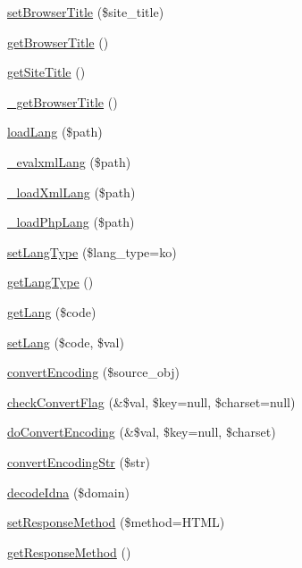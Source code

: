 \begin{DoxyCompactItemize}
\hyperlink{classContext_aab07bc95a7a855c4d9608b4ed615807f}{set\+Browser\+Title} (\$site\+\_\+title)
\item 
\hyperlink{classContext_a19f432349a41af2ed36b2cd5e6ba96a5}{get\+Browser\+Title} ()
\item 
\hyperlink{classContext_a0ee79330d3ee12c811cd784e24a7b017}{get\+Site\+Title} ()
\item 
\hyperlink{classContext_ab8f518a596abcbbd70b20dd46442ae0a}{\+\_\+get\+Browser\+Title} ()
\item 
\hyperlink{classContext_a7b22a741ff804e5cdaafd952273bd70c}{load\+Lang} (\$path)
\item 
\hyperlink{classContext_a45bd19b6edf9e66582842a3f6e50fa4b}{\+\_\+evalxml\+Lang} (\$path)
\item 
\hyperlink{classContext_af3ba6aaa8fa5f6c758b7716ec7135ab3}{\+\_\+load\+Xml\+Lang} (\$path)
\item 
\hyperlink{classContext_a3ad6fc7782e7234fe77357da28218310}{\+\_\+load\+Php\+Lang} (\$path)
\item 
\hyperlink{classContext_a234d434bfe795cbc1872ac4088b4070a}{set\+Lang\+Type} (\$lang\+\_\+type=\textquotesingle{}ko\textquotesingle{})
\item 
\hyperlink{classContext_ae75d6f4064d09e48d0d76614b6997e29}{get\+Lang\+Type} ()
\item 
\hyperlink{classContext_a9af9269b04542f7462d27a63226e0ff3}{get\+Lang} (\$code)
\item 
\hyperlink{classContext_a3615e0bc64da445f6165e97785c7d94c}{set\+Lang} (\$code, \$val)
\item 
\hyperlink{classContext_a9ef4f41a9ae7108ea7560162399c77a8}{convert\+Encoding} (\$source\+\_\+obj)
\item 
\hyperlink{classContext_ac2bf2f97195aae6b2cd6ba559bbcb18f}{check\+Convert\+Flag} (\&\$val, \$key=null, \$charset=null)
\item 
\hyperlink{classContext_ade825b985221f5bef69919e30e9ed248}{do\+Convert\+Encoding} (\&\$val, \$key=null, \$charset)
\item 
\hyperlink{classContext_a0464dcbadfd67f62265fac90546d3bf8}{convert\+Encoding\+Str} (\$str)
\item 
\hyperlink{classContext_a122117b49e4926d40dc6fc76297792bc}{decode\+Idna} (\$domain)
\item 
\hyperlink{classContext_acedc76f48ba8b7342b1bca29fcb8f202}{set\+Response\+Method} (\$method=\textquotesingle{}H\+T\+ML\textquotesingle{})
\item 
\hyperlink{classContext_a1d02a15209360034cd719d8b08cb5061}{get\+Response\+Method} ()

\end{DoxyCompactItemize}
